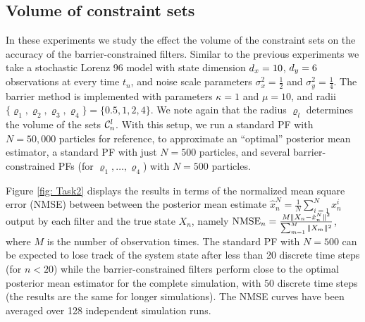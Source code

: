 \documentclass[onefignum,onetabnum]{siamonline250211}%
\begin{document}
%
\subsection{Volume of constraint sets}

In these experiments we study the effect the volume of the constraint sets on the accuracy of the barrier-constrained filters. Similar to the previous experiments we take a stochastic Lorenz 96 model with state dimension $d_x=10$, $d_y=6$ observations at every time $t_n$, and noise scale parameters $\sigma_x^2 = \frac{1}{2}$ and $\sigma_y^2=\frac{1}{4}$. The barrier method is implemented with parameters $\kappa = 1$ and $\mu=10$, and radii $\{\varrho_1,\varrho_2,\varrho_3,\varrho_4\} = \{ 0.5, 1, 2, 4\}$. We note again that the radius $\varrho_l$ determines the volume of the sets ${\mathcal C}_n^l$. With this setup, we run a standard PF with $N=50,000$ particles for reference, to approximate an ``optimal'' posterior mean estimator, a standard PF with just $N=500$ particles, and several barrier-constrained PFs (for $\varrho_1, \ldots, \varrho_4$) with $N=500$ particles.  

Figure \ref{fig: Task2} displays the results in terms of the normalized mean square error (NMSE) between between the posterior mean estimate $\hat x_n^N = \frac{1}{N}\sum_{i=1}^N x_n^i$ output by each filter and the true state $X_n$, namely ${\rm NMSE}_n = \frac{M\|X_n-\hat x_n^N\|^2}{\sum_{m=1}^M \| X_m \|^2}$, where $M$ is the number of observation times. The standard PF with $N=500$ can be expected to lose track of the system state after less than 20 discrete time steps (for $n < 20$) while the barrier-constrained filters perform close to the optimal posterior mean estimator for the complete simulation, with $50$ discrete time steps (the results are the same for longer simulations). The NMSE curves have been averaged over 128 independent simulation runs.

\end{document}
